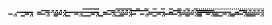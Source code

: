 \documentclass[10pt]{article}
\theoremstyle{plain}
\theoremstyle{definition}
\begin{document}
\begin{table*}[b]
{\begin{minipage}{5.32in}
\[\begin{array}{@{}r@{}}
\begin{array}{@{}l@{}}
\a\a\a\a\a\a\a\a\a\a\a\a\a\a\a\a\a\a\a\a\a\a\a\a\a\a\a\a\a\a\a\a\a\a\a\a \a\a\a\a\a\a\a\a\a\a\a\a\a\a\a\a\a\a\a\a\a\a\a\a\a\a\a\a\a\a\a\a\a\a\a\a \a\a\a\a\a\a\a\a\b\b\b\b\b\b\b\b\b\b\b\b\b\b\b\b\a\a\a\a\a\a\a\a\a\a\a\a \a\a\a\a\b\b\b\b\b\b\b\b\b\b\b\b\b\b\b\b\a\a\a\a\b\b\b\b\a\a\a\a\b\b\b\b \a\a\a\a\b\b\b\b\a\a\a\a\b\b\b\b\a\a\a\a\b\b\b\b\a\a\a\a\b\b\b\b\a\a\a\a \b\b\b\b\a\a\a\a\b\b\b\b\a\b\a\b\a\b\a\b\a\b\a\b\a\b\a\b\a\b\a\b\a\b\a\b \a\b\a\b\a\b\a\b\a\b\a\b\a\b\a\b\a\b\a\b\a\b\a\b\a\b\a\b\a\b\a\b\a\b\a\b \a\b\a\b\mynl
\a\a\a\a\a\a\a\a\a\a\a\a\a\a\a\a\a\a\a\a\a\a\a\a\a\a\a\a\a\a\a\a\a\a\a\a \a\a\a\a\b\b\b\b\b\b\b\b\a\a\b\b\a\a\b\b\a\a\b\b\a\a\b\b\a\a\a\a\a\a\a\a \a\a\a\a\a\a\a\a\a\a\a\a\a\a\a\a\a\a\a\a\a\a\a\a\a\a\a\a\a\a\a\a\b\b\b\b \b\b\b\b\a\a\b\b\a\a\b\b\a\a\b\b\a\a\b\b\b\b\b\b\b\b\b\b\b\b\b\b\b\b\b\b \a\a\a\a\a\a\a\a\a\a\a\a\a\a\a\a\a\a\a\a\a\a\a\a\b\b\b\b\b\b\b\b\a\a\b\b \a\a\b\b\a\a\b\b\a\a\b\b\b\b\b\b\b\b\b\b\b\b\b\b\b\b\b\b\a\a\a\a\a\a\a\a \a\a\a\a\a\a\a\a\a\a\a\a\a\a\a\a\b\b\b\b\b\b\b\b\a\a\b\b\a\a\b\b\a\a\b\b \a\a\b\b\mynl
\a\a\a\a\a\a\a\a\a\a\a\a\a\a\a\a\b\b\b\b\b\b\b\b\b\b\b\b\b\b\b\b\a\a\a\a \b\b\b\b\a\a\a\a\b\b\b\b\a\b\a\b\a\b\a\b\a\b\a\b\a\b\a\b\b\b\b\b\b\b\b\b \b\b\b\b\b\b\b\b\b\b\b\b\b\b\b\b\b\b\b\b\b\b\b\b\a\a\a\a\b\b\b\b\a\a\a\a \b\b\b\b\a\b\a\b\a\b\a\b\a\b\a\b\a\b\a\b\a\a\a\a\a\a\a\a\a\a\a\a\a\a\a\a \b\b\b\b\b\b\b\b\b\b\b\b\b\b\b\b\a\a\a\a\b\b\b\b\a\a\a\a\b\b\b\b\a\b\a\b \a\b\a\b\a\b\a\b\a\b\a\b\b\b\b\b\b\b\b\b\b\b\b\b\b\b\b\b\b\b\b\b\b\b\b\b \b\b\b\b\b\b\b\b\a\a\a\a\b\b\b\b\a\a\a\a\b\b\b\b\a\b\a\b\a\b\a\b\a\b\a\b \a\b\a\b\mynl
\a\a\a\a\a\a\a\a\b\b\b\b\a\a\b\b\a\a\a\a\a\a\a\a\b\b\b\b\a\a\b\b\a\a\a\a \b\b\b\b\b\b\b\b\a\a\b\b\a\a\a\a\b\b\b\b\b\b\b\b\a\a\b\b\a\a\a\a\a\a\a\a \b\b\b\b\a\a\b\b\a\a\a\a\a\a\a\a\b\b\b\b\a\a\b\b\a\a\a\a\b\b\b\b\b\b\b\b \a\a\b\b\a\a\a\a\b\b\b\b\b\b\b\b\a\a\b\b\b\b\b\b\a\a\a\a\b\b\b\b\a\a\b\b \b\b\b\b\a\a\a\a\b\b\b\b\a\a\b\b\b\b\b\b\b\b\b\b\b\b\b\b\a\a\b\b\b\b\b\b \b\b\b\b\b\b\b\b\a\a\b\b\b\b\b\b\a\a\a\a\b\b\b\b\a\a\b\b\b\b\b\b\a\a\a\a \b\b\b\b\a\a\b\b\b\b\b\b\b\b\b\b\b\b\b\b\a\a\b\b\b\b\b\b\b\b\b\b\b\b\b\b \a\a\b\b\mynl
\a\a\a\a\a\a\a\a\a\a\a\a\a\b\a\b\a\a\a\a\b\b\b\b\a\a\a\a\a\b\a\b\a\a\a\a \a\a\a\a\a\a\a\a\a\b\a\b\a\a\a\a\b\b\b\b\a\a\a\a\a\b\a\b\b\b\b\b\a\a\a\a \a\a\a\a\a\b\a\b\b\b\b\b\b\b\b\b\a\a\a\a\a\b\a\b\b\b\b\b\a\a\a\a\a\a\a\a \a\b\a\b\b\b\b\b\b\b\b\b\a\a\a\a\a\b\a\b\a\a\a\a\a\a\a\a\a\a\a\a\a\b\a\b \a\a\a\a\b\b\b\b\a\a\a\a\a\b\a\b\a\a\a\a\a\a\a\a\a\a\a\a\a\b\a\b\a\a\a\a \b\b\b\b\a\a\a\a\a\b\a\b\b\b\b\b\a\a\a\a\a\a\a\a\a\b\a\b\b\b\b\b\b\b\b\b \a\a\a\a\a\b\a\b\b\b\b\b\a\a\a\a\a\a\a\a\a\b\a\b\b\b\b\b\b\b\b\b\a\a\a\a \a\b\a\b\mynl

\end{array}
\end{array}\]
\end{minipage}}
\end{table*}
\end{document}
